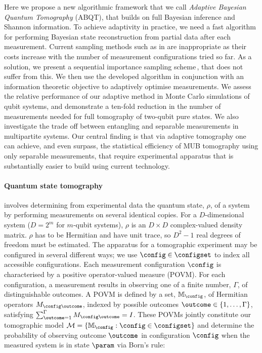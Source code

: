 Here we propose a new algorithmic framework that we call \emph{Adaptive Bayesian Quantum Tomography} (ABQT), that builds on full Bayesian inference and Shannon information. 
To achieve adaptivity in practice, we need a fast algorithm for performing Bayesian state reconstruction from partial data after each measurement. Current sampling methods such as in \cite{BayesianTomography} are inappropriate as their costs increase with the number of measurement configurations tried so far. As a solution, we present a sequential importance sampling scheme\,\cite{SMCBook}, that does not suffer from this. We then use the developed algorithm in conjunction with an information theoretic objective to adaptively optimise measurements. We assess the relative performance of our adaptive method in Monte Carlo simulations of qubit systems, and demonstrate a ten-fold reduction in the number of measurements needed for full tomography of two-qubit pure states. We also investigate the trade off between entangling and separable measurements in multipartite systems. Our central finding is that via adaptive tomography one can achieve, and even surpass, the statistical efficiency of MUB tomography using only separable measurements, that require experimental apparatus that is substantially easier to build using current technology.

\paragraph{Quantum state tomography} involves determining from experimental data the quantum state, $\rho$, of a system by performing measurements on several identical copies. For a $D$-dimensional system ($D=2^m$ for $m$-qubit systems), $\rho$ is an $D \times D$ complex-valued density matrix. $\rho$ has to be Hermitian and have unit trace, so $D^2-1$ real degrees of freedom must be estimated. The apparatus for a tomographic experiment may be configured in several different ways; we use $\config\in\configset$ to index all accessible configurations. Each measurement configuration $\config$ is characterised by a positive operator-valued measure (POVM). For each configuration, a measurement results in observing one of a finite number, $\Gamma$, of distinguishable outcomes. A POVM is defined by a set, $\mathbb{M}_{\config}$, of Hermitian operators $M_{\config\outcome}$, indexed by possible outcomes $\outcome\in\{1,\ldots,\Gamma\}$, satisfying $\sum_{\outcome=1}^{\Gamma} M_{\config\outcome} = I$. These POVMs jointly constitute our tomographic model $\mathcal{M}=\{\mathbb{M}_{\config}:\config\in\configset\}$ and determine the probability of observing outcome $\outcome$ in configuration $\config$ when the measured system is in state $\param$ via Born's rule:

